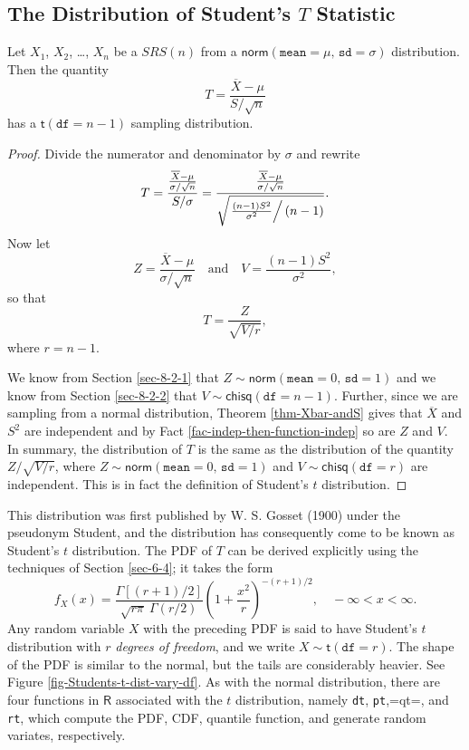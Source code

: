 \subsection{The Distribution of Student's \(T\) Statistic}
\label{sec-8-2-3}

\begin{prop}
Let \(X_{1}\), \(X_{2}\), \ldots{}, \(X_{n}\) be a \(SRS(n)\) from a
\(\mathsf{norm}(\mathtt{mean}=\mu,\,\mathtt{sd}=\sigma)\)
distribution. Then the quantity
\begin{equation}
T=\frac{\overline{X}-\mu}{S/\sqrt{n}}
\end{equation}
has a \(\mathsf{t}(\mathtt{df}=n-1)\) sampling distribution.
\end{prop}

\begin{proof}
Divide the numerator and denominator by \(\sigma\) and rewrite \[
T=\frac{\frac{\overline{X}-\mu}{\sigma/\sqrt{n}}}{S/\sigma}=\frac{\frac{\overline{X}-\mu}{\sigma/\sqrt{n}}}{\sqrt{\left.\frac{(n-1)S^{2}}{\sigma^{2}}\right/
(n-1)}}.  \] Now let \[
Z=\frac{\overline{X}-\mu}{\sigma/\sqrt{n}}\quad \mbox{and}\quad
V=\frac{(n-1)S^{2}}{\sigma^{2}}, \] so that
\begin{equation}
T=\frac{Z}{\sqrt{V/r}},
\end{equation}
where \(r=n-1\).

We know from Section \ref{sec-8-2-1} that
\(Z\sim\mathsf{norm}(\mathtt{mean}=0,\,\mathtt{sd}=1)\) and we know
from Section \ref{sec-8-2-2} that
\(V\sim\mathsf{chisq}(\mathtt{df}=n-1)\). Further, since we are
sampling from a normal distribution, Theorem \ref{thm-Xbar-andS} gives
that \(\overline{X}\) and \(S^{2}\) are independent and by Fact
\ref{fac-indep-then-function-indep} so are \(Z\) and \(V\). In summary,
the distribution of \(T\) is the same as the distribution of the
quantity \(Z/\sqrt{V/r}\), where
\(Z\sim\mathsf{norm}(\mathtt{mean}=0,\,\mathtt{sd}=1)\) and
\(V\sim\mathsf{chisq}(\mathtt{df}=r)\) are independent. This is in
fact the definition of Student's \(t\) distribution.
\end{proof}

This distribution was first published by W. S. Gosset (1900) under the
pseudonym Student, and the distribution has consequently come to be
known as Student's \(t\) distribution. The PDF of \(T\) can be derived
explicitly using the techniques of Section \ref{sec-6-4}; it takes the form
\begin{equation}
f_{X}(x)=\frac{\Gamma[(r+1)/2]}{\sqrt{r\pi}\ \Gamma(r/2)}\left(1+\frac{x^{2}}{r}\right)^{-(r+1)/2},\quad -\infty < x < \infty.
\end{equation}
Any random variable \(X\) with the preceding PDF is said to have
Student's \(t\) distribution with \(r\) \emph{degrees of freedom}, and we
write \(X\sim\mathsf{t}(\mathtt{df}=r)\). The shape of the PDF is
similar to the normal, but the tails are considerably heavier. See
Figure \ref{fig-Students-t-dist-vary-df}. As with the normal distribution,
there are four functions in \(\mathsf{R}\) associated with the \(t\)
distribution, namely \texttt{dt}, \texttt{pt},=qt=, and \texttt{rt}, which compute the PDF,
CDF, quantile function, and generate random variates, respectively.

